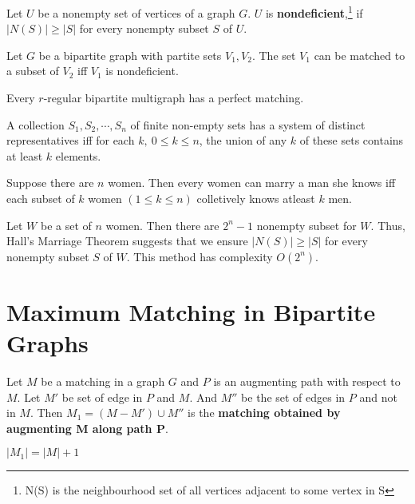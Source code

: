 \begin{definition}
	Let $U$ be a nonempty set of vertices of a graph $G$. $U$ is \textbf{nondeficient},\footnote{N(S) is the neighbourhood set of all vertices adjacent to some vertex in S} if $|N(S)| \ge |S|$ for every nonempty subset $S$ of $U$.
\end{definition}

\begin{theorem}
	Let $G$ be a bipartite graph with partite sets $V_1,V_2$. The set $V_1$ can be matched to a subset of $V_2$ iff $V_1$ is nondeficient.
\end{theorem}
\begin{corollary}
	Every $r$-regular bipartite multigraph has a perfect matching.
\end{corollary}

\begin{theorem}
	A collection $S_1,S_2,\cdots,S_n$ of finite non-empty sets has a system of distinct representatives iff for each $k,\ 0 \le k \le n$, the union of any $k$ of these sets contains at least $k$ elements.
\end{theorem}

\begin{remark}
	Suppose there are $n$ women. Then every women can marry a man she knows iff each subset of $k$ women $(1 \le k \le n)$ colletively knows atleast $k$ men. 
\end{remark}

\begin{remark}
	Let $W$ be a set of $n$ women. Then there are $2^n-1$ nonempty subset for $W$. Thus, Hall's Marriage Theorem suggests that we ensure $|N(S)| \ge |S|$ for every nonempty subset $S$ of $W$. This method has complexity $O(2^n)$.
\end{remark}

\section{Maximum Matching in Bipartite Graphs}

\begin{definition}
	Let $M$ be a matching in a graph $G$ and $P$ is an augmenting path with respect to $M$. Let $M'$ be set of edge in $P$ and $M$. And $M''$ be the set of edges in $P$ and not in $M$. Then $M_1 = (M-M') \cup M''$ is the \textbf{matching obtained by augmenting M along path P}.
\end{definition}

\begin{remark}
	$|M_1| = |M|+1$
\end{remark}

